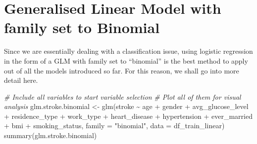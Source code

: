 \documentclass[
]{article}
\newenvironment{Shaded}{\begin{snugshade}}{\end{snugshade}}
\newcommand{\AttributeTok}[1]{\textcolor[rgb]{0.77,0.63,0.00}{#1}}
\newcommand{\CommentTok}[1]{\textcolor[rgb]{0.56,0.35,0.01}{\textit{#1}}}
\newcommand{\FunctionTok}[1]{\textcolor[rgb]{0.00,0.00,0.00}{#1}}
\newcommand{\NormalTok}[1]{#1}
\newcommand{\OtherTok}[1]{\textcolor[rgb]{0.56,0.35,0.01}{#1}}
\newcommand{\SpecialCharTok}[1]{\textcolor[rgb]{0.00,0.00,0.00}{#1}}
\newcommand{\StringTok}[1]{\textcolor[rgb]{0.31,0.60,0.02}{#1}}
\renewcommand{\=}[1]{\stackrel{#1}{=}}
\theoremstyle{definition}
\theoremstyle{remark}
\begin{document}
\hypertarget{generalised-linear-model-with-family-set-to-binomial}{%
\section{Generalised Linear Model with family set to Binomial}\label{generalised-linear-model-with-family-set-to-binomial}}

Since we are essentially dealing with a classification issue, using logistic regression in the form of a GLM with family set to ``binomial'' is the best method to apply out of all the models introduced so far. For this reason, we shall go into more detail here.

\begin{Shaded}
\begin{Highlighting}[]
\CommentTok{\# Include all variables to start variable selection}
\CommentTok{\# Plot all of them for visual analysis}
\NormalTok{glm.stroke.binomial }\OtherTok{\textless{}{-}} \FunctionTok{glm}\NormalTok{(stroke }\SpecialCharTok{\textasciitilde{}}\NormalTok{ age }\SpecialCharTok{+}\NormalTok{ gender }\SpecialCharTok{+}\NormalTok{ avg\_glucose\_level }\SpecialCharTok{+}\NormalTok{ residence\_type }\SpecialCharTok{+}\NormalTok{ work\_type }\SpecialCharTok{+}\NormalTok{ heart\_disease }\SpecialCharTok{+}\NormalTok{ hypertension }\SpecialCharTok{+}\NormalTok{ ever\_married }\SpecialCharTok{+}\NormalTok{ bmi }\SpecialCharTok{+}\NormalTok{ smoking\_status,}
\AttributeTok{family =} \StringTok{"binomial"}\NormalTok{,}
\AttributeTok{data =}\NormalTok{ df\_train\_linear)}
\FunctionTok{summary}\NormalTok{(glm.stroke.binomial)}
\end{Highlighting}
\end{Shaded}
\end{document}
